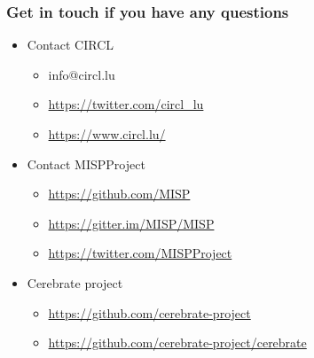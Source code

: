 \begin{frame}
  \frametitle{Get in touch if you have any questions}
  \begin{itemize}
    \item Contact CIRCL
    \begin{itemize}
      \item info@circl.lu
      \item \url{https://twitter.com/circl_lu}
      \item \url{https://www.circl.lu/}
    \end{itemize}
    \item Contact MISPProject 
    \begin{itemize}
      \item \url{https://github.com/MISP}
      \item \url{https://gitter.im/MISP/MISP}
      \item \url{https://twitter.com/MISPProject}
    \end{itemize}
    \item Cerebrate project
    \begin{itemize}
      \item \url{https://github.com/cerebrate-project}
      \item \url{https://github.com/cerebrate-project/cerebrate}
    \end{itemize}
  \end{itemize}
\end{frame}

